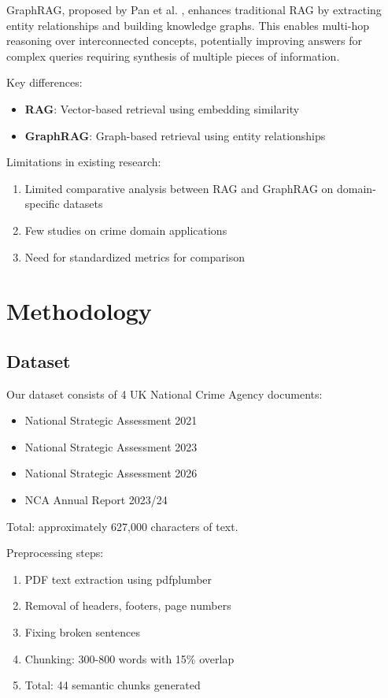 \documentclass[a4paper,12pt]{article}
\begin{document}
GraphRAG, proposed by Pan et al. \cite{pan2024}, enhances traditional RAG by extracting entity relationships and building knowledge graphs. This enables multi-hop reasoning over interconnected concepts, potentially improving answers for complex queries requiring synthesis of multiple pieces of information.

Key differences:
\begin{itemize}
    \item \textbf{RAG}: Vector-based retrieval using embedding similarity
    \item \textbf{GraphRAG}: Graph-based retrieval using entity relationships
\end{itemize}

Limitations in existing research:
\begin{enumerate}
    \item Limited comparative analysis between RAG and GraphRAG on domain-specific datasets
    \item Few studies on crime domain applications
    \item Need for standardized metrics for comparison
\end{enumerate}

\section{Methodology}

\subsection{Dataset}
Our dataset consists of 4 UK National Crime Agency documents:
\begin{itemize}
    \item National Strategic Assessment 2021
    \item National Strategic Assessment 2023  
    \item National Strategic Assessment 2026
    \item NCA Annual Report 2023/24
\end{itemize}

Total: approximately 627,000 characters of text.

Preprocessing steps:
\begin{enumerate}
    \item PDF text extraction using pdfplumber
    \item Removal of headers, footers, page numbers
    \item Fixing broken sentences
    \item Chunking: 300-800 words with 15\% overlap
    \item Total: 44 semantic chunks generated
\end{enumerate}
\end{document}
